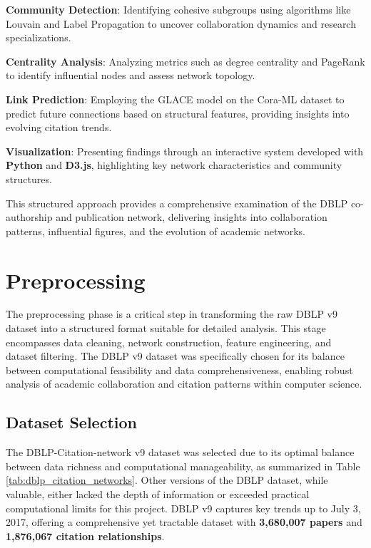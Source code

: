 \documentclass[11pt]{article}
\begin{document}
\textbf{Community Detection}: Identifying cohesive subgroups using algorithms like Louvain and Label Propagation to uncover collaboration dynamics and research specializations.

\textbf{Centrality Analysis}: Analyzing metrics such as degree centrality and PageRank to identify influential nodes and assess network topology.

\textbf{Link Prediction}: Employing the GLACE model on the Cora-ML dataset to predict future connections based on structural features, providing insights into evolving citation trends.

\textbf{Visualization}: Presenting findings through an interactive system developed with \textbf{Python} and \textbf{D3.js}, highlighting key network characteristics and community structures.

This structured approach provides a comprehensive examination of the DBLP co-authorship and publication network, delivering insights into collaboration patterns, influential figures, and the evolution of academic networks.

\section{Preprocessing}

The preprocessing phase is a critical step in transforming the raw DBLP v9 dataset into a structured format suitable for detailed analysis. This stage encompasses data cleaning, network construction, feature engineering, and dataset filtering. The DBLP v9 dataset was specifically chosen for its balance between computational feasibility and data comprehensiveness, enabling robust analysis of academic collaboration and citation patterns within computer science.

\subsection{Dataset Selection}

The DBLP-Citation-network v9 dataset was selected due to its optimal balance between data richness and computational manageability, as summarized in Table \ref{tab:dblp_citation_networks}. Other versions of the DBLP dataset, while valuable, either lacked the depth of information or exceeded practical computational limits for this project. DBLP v9 captures key trends up to July 3, 2017, offering a comprehensive yet tractable dataset with \textbf{3,680,007 papers} and \textbf{1,876,067 citation relationships}.
\end{document}
